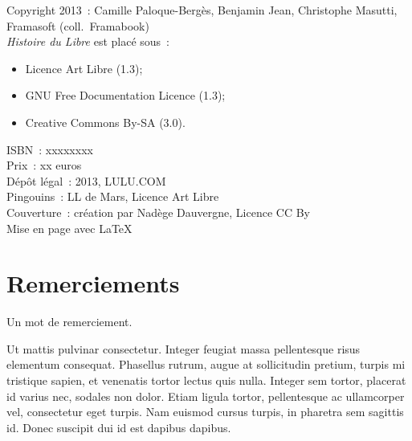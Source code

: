 \documentclass{FramateX}
\begin{document}
\begin{titlepage}
\bigskip

\begin{small}
\noindent Copyright 2013~: Camille Paloque-Bergès, Benjamin Jean, Christophe Masutti, Framasoft (coll.~Framabook)\\
\textit{Histoire du Libre} est placé sous~:
\begin{itemize}
\item     Licence Art Libre (1.3);
  \item     GNU Free Documentation Licence (1.3);
  \item     Creative Commons By-SA (3.0).
  \end{itemize}

\noindent ISBN~: xxxxxxxx \\
Prix~: xx euros \\
Dépôt légal~: 2013, LULU.COM \\
Pingouins~: LL de Mars, Licence Art Libre \\
Couverture~: création par Nadège Dauvergne, Licence CC By \\
Mise en page avec \LaTeX  \\
\end{small}



\end{titlepage}

                        
                        
                       
                        
\cleardoublepage

\chapter*{Remerciements}
{}

%

Un mot de remerciement.

Ut mattis pulvinar consectetur. Integer feugiat massa pellentesque risus elementum consequat. Phasellus rutrum, augue at sollicitudin pretium, turpis mi tristique sapien, et venenatis tortor lectus quis nulla. Integer sem tortor, placerat id varius nec, sodales non dolor. Etiam ligula tortor, pellentesque ac ullamcorper vel, consectetur eget turpis. Nam euismod cursus turpis, in pharetra sem sagittis id. Donec suscipit dui id est dapibus dapibus.
\end{document}
